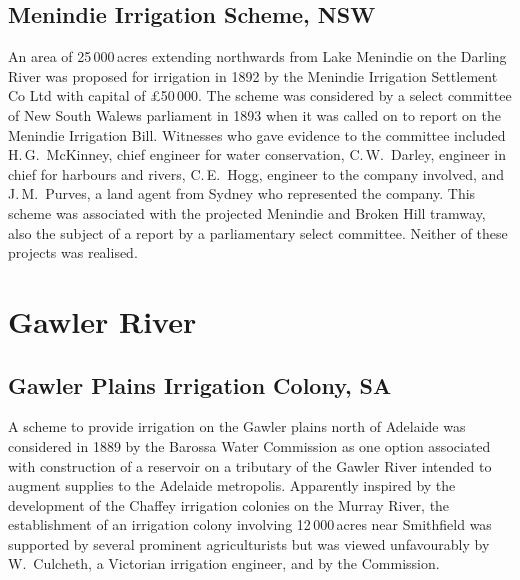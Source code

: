 \subsection*{Menindie Irrigation Scheme, NSW}

An area of 25\,000\,acres extending northwards from Lake Menindie on
the Darling River was proposed for irrigation in 1892 by the Menindie
Irrigation Settlement Co Ltd with capital of \pounds50\,000.  The
scheme was considered by a select committee of New South Walews
parliament in 1893 when it was called on to report on the Menindie
Irrigation Bill.  Witnesses who gave evidence to the committee
included H.\,G.~McKinney, chief engineer for water conservation,
C.\,W.~Darley, engineer in chief for harbours and rivers, C.\,E.~Hogg,
engineer to the company involved, and J.\,M.~Purves, a land agent from
Sydney who represented the company.  This scheme was associated with
the projected Menindie and Broken Hill tramway, also the subject of a
report by a parliamentary select committee.  Neither of these projects
was realised.

\section*{Gawler River}

\subsection*{Gawler Plains Irrigation Colony, SA}

A scheme to provide irrigation on the Gawler plains north of Adelaide
was considered in 1889 by the Barossa Water Commission as one option
associated with construction of a reservoir on a tributary of the
Gawler River intended to augment supplies to the Adelaide metropolis.
Apparently inspired by the development of the Chaffey irrigation
colonies on the Murray River, the establishment of an irrigation
colony involving 12\,000\,acres near Smithfield was supported by several
prominent agriculturists but was viewed unfavourably by W.~Culcheth, a
Victorian irrigation engineer, and by the Commission.

